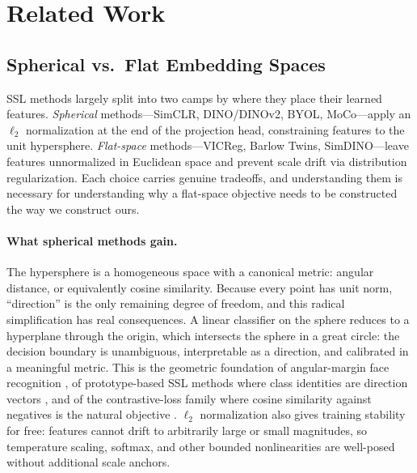 \section{Related Work}
\label{sec:related_work}

\subsection{Spherical vs.\ Flat Embedding Spaces}
\label{sec:sphere_vs_flat}

SSL methods largely split into two camps by where they place their learned features. \emph{Spherical} methods---SimCLR, DINO/DINOv2, BYOL, MoCo---apply an $\ell_2$ normalization at the end of the projection head, constraining features to the unit hypersphere. \emph{Flat-space} methods---VICReg, Barlow Twins, SimDINO---leave features unnormalized in Euclidean space and prevent scale drift via distribution regularization. Each choice carries genuine tradeoffs, and understanding them is necessary for understanding why a flat-space objective needs to be constructed the way we construct ours.

\paragraph{What spherical methods gain.}
The hypersphere is a homogeneous space with a canonical metric: angular distance, or equivalently cosine similarity. Because every point has unit norm, ``direction'' is the only remaining degree of freedom, and this radical simplification has real consequences. A linear classifier on the sphere reduces to a hyperplane through the origin, which intersects the sphere in a great circle: the decision boundary is unambiguous, interpretable as a direction, and calibrated in a meaningful metric. This is the geometric foundation of angular-margin face recognition \citep{wang2017normface, meng2021magface, kim2022adaface}, of prototype-based SSL methods where class identities are direction vectors \citep{caron2021emerging, oquab2023dinov2}, and of the contrastive-loss family where cosine similarity against negatives is the natural objective \citep{chen2020simclr}. $\ell_2$ normalization also gives training stability for free: features cannot drift to arbitrarily large or small magnitudes, so temperature scaling, softmax, and other bounded nonlinearities are well-posed without additional scale anchors.

